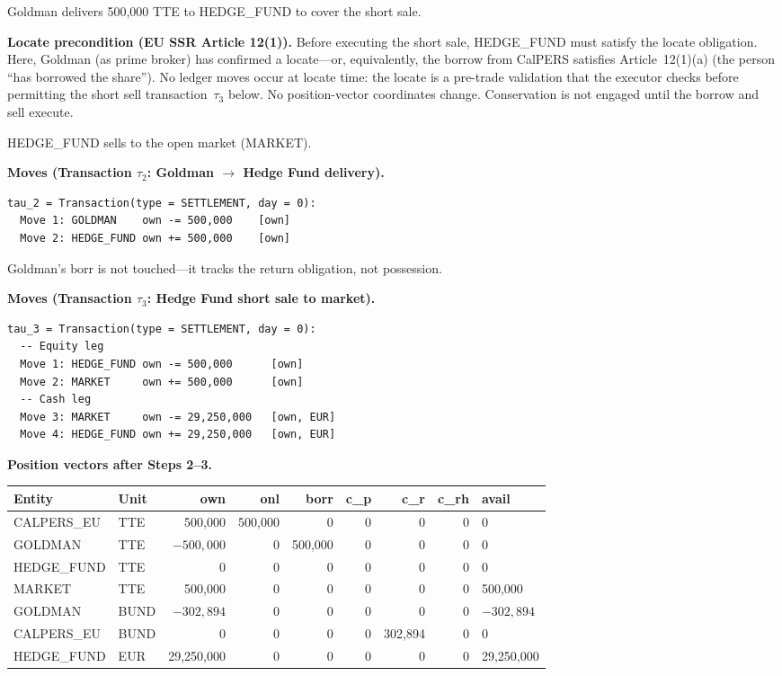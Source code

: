 \documentclass[11pt,a4paper]{article}
\begin{document}
Goldman delivers 500{,}000 TTE to HEDGE\_FUND to cover the short sale.

\medskip
\noindent\textbf{Locate precondition (EU SSR Article 12(1)).} Before executing the short sale, HEDGE\_FUND must satisfy the locate obligation. Here, Goldman (as prime broker) has confirmed a locate---or, equivalently, the borrow from CalPERS satisfies Article~12(1)(a) (the person ``has borrowed the share''). No ledger moves occur at locate time: the locate is a pre-trade validation that the executor checks before permitting the short sell transaction~$\tau_3$ below. No position-vector coordinates change. Conservation is not engaged until the borrow and sell execute.

\medskip
\noindent HEDGE\_FUND sells to the open market (MARKET).

\medskip
\noindent\textbf{Moves (Transaction $\tau_2$: Goldman $\to$ Hedge Fund delivery).}

\begin{lstlisting}
tau_2 = Transaction(type = SETTLEMENT, day = 0):
  Move 1: GOLDMAN    own -= 500,000    [own]
  Move 2: HEDGE_FUND own += 500,000    [own]
\end{lstlisting}

Goldman's $\mathrm{borr}$ is not touched---it tracks the return obligation, not possession.

\medskip
\noindent\textbf{Moves (Transaction $\tau_3$: Hedge Fund short sale to market).}

\begin{lstlisting}
tau_3 = Transaction(type = SETTLEMENT, day = 0):
  -- Equity leg
  Move 1: HEDGE_FUND own -= 500,000      [own]
  Move 2: MARKET     own += 500,000      [own]
  -- Cash leg
  Move 3: MARKET     own -= 29,250,000   [own, EUR]
  Move 4: HEDGE_FUND own += 29,250,000   [own, EUR]
\end{lstlisting}

\noindent\textbf{Position vectors after Steps 2--3.}

\begin{center}\small
\begin{tabular}{l l r r r r r r l}
\toprule
\textbf{Entity} & \textbf{Unit} & own & onl & borr & c\_p & c\_r & c\_rh & avail \\
\midrule
CALPERS\_EU & TTE & 500{,}000 & 500{,}000 & 0 & 0 & 0 & 0 & 0 \\
GOLDMAN & TTE & $-500{,}000$ & 0 & 500{,}000 & 0 & 0 & 0 & 0 \\
HEDGE\_FUND & TTE & 0 & 0 & 0 & 0 & 0 & 0 & 0 \\
MARKET & TTE & 500{,}000 & 0 & 0 & 0 & 0 & 0 & 500{,}000 \\
\midrule
GOLDMAN & BUND & $-302{,}894$ & 0 & 0 & 0 & 0 & 0 & $-302{,}894$ \\
CALPERS\_EU & BUND & 0 & 0 & 0 & 0 & 302{,}894 & 0 & 0 \\
\midrule
HEDGE\_FUND & EUR & 29{,}250{,}000 & 0 & 0 & 0 & 0 & 0 & 29{,}250{,}000 \\
\bottomrule
\end{tabular}
\end{center}
\end{document}
